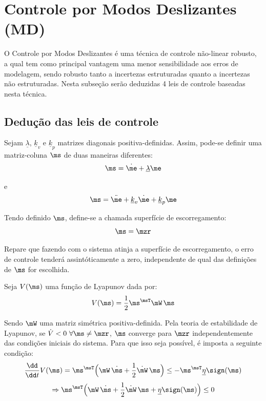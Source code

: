 \documentclass[]{politex}
\begin{document}
\section{Controle por Modos Deslizantes (MD)} \label{sec:CMD}

O Controle por Modos Deslizantes é uma técnica de controle não-linear robusto, a qual tem como principal vantagem uma menor sensibilidade aos erros de modelagem, sendo robusto tanto a incertezas estruturadas quanto a incertezas não estruturadas. Nesta subseção serão deduzidas 4 leis de controle baseadas nesta técnica.

\subsection{Dedução das leis de controle}

Sejam $\underline{\lambda}$, $\underline{k}_v$ e $\underline{k}_p$ matrizes diagonais positiva-definidas. Assim, pode-se definir uma matriz-coluna $\ms$ de duas maneiras diferentes:
\begin{equation} \label{eq:SlidingSurfaces}
\ms = \dot{\me} + \underline{\lambda}\me
\end{equation}

e
\begin{equation} \label{eq:SlidingSurfaces_}
\ms = \ddot{\me} + \underline{k}_v\dot{\me} + \underline{k}_p\me
\end{equation}

Tendo definido $\ms$, define-se a chamada superfície de escorregamento:
\begin{equation} \label{eq:SuperficieDeEscorregamento}
\ms = \mzr
\end{equation}

Repare que fazendo com o sistema atinja a superfície de escorregamento, o erro de controle tenderá assintóticamente a zero, independente de qual das definições de $\ms$ for escolhida.
 
Seja $V(\ms)$ uma função de Lyapunov dada por:
\begin{equation}
V(\ms) = \frac{1}{2} \ms^\msT \mW \, \ms
\end{equation}

Sendo $\mW$ uma matriz simétrica positiva-definida. Pela teoria de estabilidade de Lyapunov, se $\dot{V} < 0 \,\, \forall \ms \neq \mzr$, $\ms$ converge para $\mzr$ independentemente das condi\c{c}\~oes iniciais do sistema. Para que isso seja poss\'ivel, \'e imposta a seguinte condi\c{c}\~ao:
\begin{equation} \label{eq:SlidingCondition}
\frac{\dd}{\dd t} V(\ms) = \ms^\msT \Big( \mW \, \dot{\ms} + \frac{1}{2}  \dot{\mW} \, \ms \Big) \leq -   \ms^\msT \underline{\eta} \sign(\ms) 
\end{equation}
\begin{equation}
\Rightarrow \ms^\msT \Big( \mW \, \dot{\ms} + \frac{1}{2}  \dot{\mW} \, \ms + \underline{\eta} \sign(\ms)  \Big) \leq 0
\end{equation}
\end{document}
